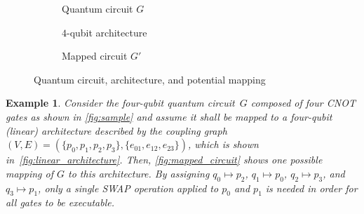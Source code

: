 \documentclass[10pt,conference]{IEEEtran}
\newtheorem{example}{Example}
\begin{document}
\begin{figure}[t]
    \centering
    \begin{subfigure}[t]{0.29\linewidth}
 \centering
 \caption{Quantum circuit $G$}\label{fig:sample}
    \end{subfigure}
    \hfill    
    \begin{subfigure}[t]{0.30\linewidth}
 \centering
 \caption{$4$-qubit architecture}\label{fig:linear_architecture}
    \end{subfigure}
        \hfill    
    \begin{subfigure}[t]{0.38\linewidth}
 \centering
 \caption{Mapped circuit $G'$}\label{fig:mapped_circuit}
    \end{subfigure}
    \caption{Quantum circuit, architecture, and potential mapping}\label{fig:circ_arch}
    \vspace*{-1.5em}
\end{figure}

\begin{example}
	Consider the four-qubit quantum circuit~$G$ composed of four \textit{CNOT} gates as shown in \autoref{fig:sample} and assume it shall be mapped to a four-qubit (linear) architecture described by the coupling graph
	\mbox{$
	(V, E) = (\{p_0, p_1, p_2, p_3\}, \{e_{01}, e_{12}, e_{23}\})
	$}, which is shown in~\autoref{fig:linear_architecture}.
	Then, \autoref{fig:mapped_circuit} shows one possible mapping of $G$ to this architecture.
	By assigning $q_0\mapsto p_2$, $q_1 \mapsto p_0$, $q_2\mapsto p_3$, and $q_3 \mapsto p_1$, only a single \textit{SWAP} operation applied to $p_0$ and $p_1$ is needed in order for all gates to be executable.
\end{example}
\end{document}

